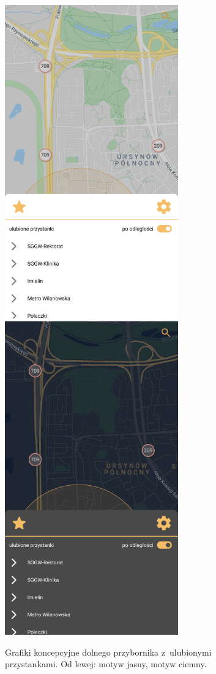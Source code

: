 \documentclass{SGGW-thesis}
\begin{document}
\begin{figure}
  \centering
  \includegraphics[width=75mm]{koncepty/screen_day_home_menu_click}
  \enspace
  \includegraphics[width=75mm]{koncepty/screen_night_home_menu_click}
  \caption[Dolny przybornik]{
    \label{koncept.dolny_przybornik}
    Grafiki koncepcyjne dolnego przybornika z~ulubionymi przystankami. Od lewej: motyw jasny, motyw ciemny. \vspace{2ex}
  }
\end{figure}
\end{document}
